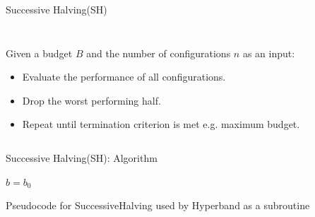 \begin{frame}{Successive Halving(SH)}
\begin{columns}
\begin{column}{.5\textwidth}
\begin{figure}
\end{figure}
\end{column}
\end{columns}
\vspace{-5em}
\begin{columns}
\begin{column}{.45\textwidth}
Given a budget $B$ and the number of configurations $n$ as an input:
\pause
\begin{itemize}
    \item Evaluate the performance of all configurations.
    \pause
    \item Drop the worst performing half.
    \pause
    \item Repeat until termination criterion is met e.g. maximum budget.

\end{itemize}
\end{column}

\begin{column}{.45\textwidth}
\end{column}

\end{columns}

\end{frame}


\begin{frame}{Successive Halving(SH): Algorithm}
\begin{algorithm}[H]
    \LinesNumbered
    \SetAlgoLined
    \setcounter{AlgoLine}{0}
    \DeclarePairedDelimiter\ceil{\lceil}{\rceil}
    \DeclarePairedDelimiter\floor{\lfloor}{\rfloor}
    \DeclarePairedDelimiter\abs{\lvert}{\rvert}
    
    $b=b_0$\\
    
 
        
    
    \caption{Pseudocode for SuccessiveHalving used by Hyperband as a subroutine}
\end{algorithm}

\end{frame}

